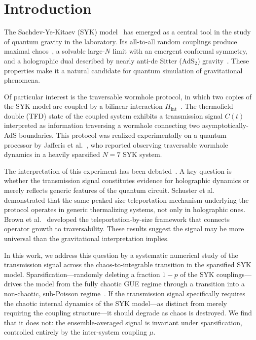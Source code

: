 \documentclass[aps,prd,twocolumn,superscriptaddress,nofootinbib,floatfix]{revtex4-2}
\begin{document}
\maketitle

\section{Introduction}
\label{sec:intro}

The Sachdev-Ye-Kitaev (SYK) model~\cite{Sachdev:1993,Kitaev:2015} has emerged
as a central tool in the study of quantum gravity in the laboratory. Its
all-to-all random couplings produce maximal chaos~\cite{Maldacena:2015waa},
a solvable large-$N$ limit with an emergent conformal symmetry, and a
holographic dual described by nearly anti-de Sitter (AdS$_2$)
gravity~\cite{Maldacena:2016hyu}. These properties make it a natural candidate
for quantum simulation of gravitational phenomena.

Of particular interest is the traversable wormhole protocol, in which two
copies of the SYK model are coupled by a bilinear interaction
$H_\mathrm{int}$~\cite{Gao:2016bin,Maldacena:2018lmt}. The thermofield double
(TFD) state of the coupled system exhibits a transmission signal $C(t)$
interpreted as information traversing a wormhole connecting two
asymptotically-AdS boundaries. This protocol was realized experimentally on a
quantum processor by Jafferis et al.~\cite{Jafferis:2022uhu}, who reported
observing traversable wormhole dynamics in a heavily sparsified $N=7$ SYK
system.

The interpretation of this experiment has been
debated~\cite{Kobrin:2023cva}. A key question is whether the transmission
signal constitutes evidence for holographic dynamics or merely reflects generic
features of the quantum circuit. Schuster et
al.~\cite{Schuster:2021uvg} demonstrated that the same peaked-size
teleportation mechanism underlying the protocol operates in generic
thermalizing systems, not only in holographic ones. Brown et
al.~\cite{Brown:2019hmk} developed the teleportation-by-size framework that
connects operator growth to traversability. These results suggest the signal
may be more universal than the gravitational interpretation implies.

In this work, we address this question by a systematic numerical study of the
transmission signal across the chaos-to-integrable transition in the
sparsified SYK model. Sparsification---randomly deleting a fraction $1-p$ of
the SYK couplings---drives the model from the fully chaotic GUE regime
through a transition into a non-chaotic, sub-Poisson
regime~\cite{Garcia-Garcia:2020ttf,Xu:2020shn}. If the transmission signal specifically requires the chaotic internal
dynamics of the SYK model---as distinct from merely requiring the
coupling structure---it should degrade as chaos is destroyed. We find
that it does not: the ensemble-averaged signal is invariant under
sparsification, controlled entirely by the inter-system coupling $\mu$.
\end{document}
